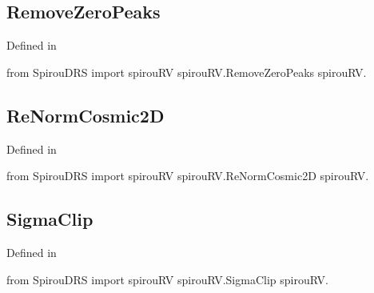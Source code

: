 \begin{minipage}{\textwidth}
\subsection{RemoveZeroPeaks}

Defined in \spirouRV{}

\begin{pythonbox}
from SpirouDRS import spirouRV
spirouRV.RemoveZeroPeaks
spirouRV.
\end{pythonbox}

\begin{pythondocstring}

\end{pythondocstring}
\end{minipage}

\begin{minipage}{\textwidth}
\subsection{ReNormCosmic2D}

Defined in \spirouRV{}

\begin{pythonbox}
from SpirouDRS import spirouRV
spirouRV.ReNormCosmic2D
spirouRV.
\end{pythonbox}

\begin{pythondocstring}

\end{pythondocstring}
\end{minipage}

\begin{minipage}{\textwidth}
\subsection{SigmaClip}

Defined in \spirouRV{}

\begin{pythonbox}
from SpirouDRS import spirouRV
spirouRV.SigmaClip
spirouRV.
\end{pythonbox}

\begin{pythondocstring}

\end{pythondocstring}
\end{minipage}

